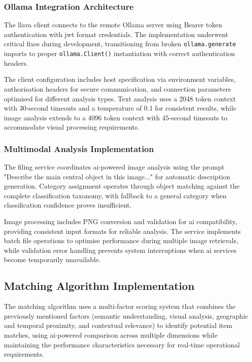 \subsubsection{Ollama Integration Architecture}

The \ac{llava} client connects to the remote Ollama server using Bearer token authentication with \ac{jwt} format credentials. The implementation underwent critical fixes during development, transitioning from broken \texttt{ollama.generate} imports to proper \texttt{ollama.Client()} instantiation with correct authentication headers.


The client configuration includes host specification via environment variables, authorisation headers for secure communication, and connection parameters optimised for different analysis types. Text analysis uses a 2048 token context with 30-second timeouts and a temperature of 0.1 for consistent results, while image analysis extends to a 4096 token context with 45-second timeouts to accommodate visual processing requirements.

\subsubsection{Multimodal Analysis Implementation}

The filing service coordinates \ac{ai}-powered image analysis using the prompt "Describe the main central object in this image..." for automatic description generation. Category assignment operates through object matching against the complete classification taxonomy, with fallback to a general category when classification confidence proves insufficient.

Image processing includes PNG conversion and validation for \ac{ai} compatibility, providing consistent input formats for reliable analysis. The service implements batch file operations to optimise performance during multiple image retrievals, while validation error handling prevents system interruptions when \ac{ai} services become temporarily unavailable.

\subsection{Matching Algorithm Implementation} \label{subsection:matching_algorithm}

The matching algorithm uses a multi-factor scoring system that combines the previously mentioned factors (semantic understanding, visual analysis, geographic and temporal proximity, and contextual relevance) to identify potential item matches, using \ac{ai}-powered comparison across multiple dimensions while maintaining the performance characteristics necessary for real-time operational requirements.

